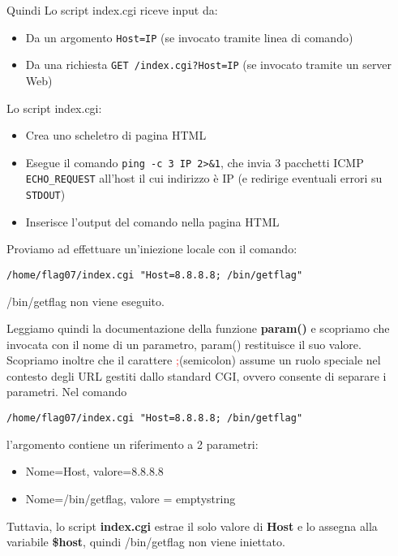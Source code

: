 Quindi Lo script index.cgi riceve input da:
\begin{itemize}
    \item Da un argomento \texttt{Host=IP} (se invocato tramite linea di comando)
    \item Da una richiesta \texttt{GET /index.cgi?Host=IP} (se invocato tramite un server Web)
\end{itemize}
Lo script index.cgi:
\begin{itemize}
    \item Crea uno scheletro di pagina HTML
    \item Esegue il comando \texttt{ping -c 3 IP 2>\&1}, che invia 3 pacchetti ICMP \texttt{ECHO\_REQUEST} all’host il cui indirizzo è IP (e redirige eventuali errori su \texttt{STDOUT})
    \item Inserisce l’output del comando nella pagina HTML
\end{itemize}
Proviamo ad effettuare un’iniezione locale con il comando:
\begin{lstlisting}[style=bashstyle]
    /home/flag07/index.cgi "Host=8.8.8.8; /bin/getflag"
\end{lstlisting}
/bin/getflag non viene eseguito.

Leggiamo quindi la documentazione della funzione \textbf{param()} e scopriamo che invocata con il nome di un parametro, param() restituisce il suo valore.
Scopriamo inoltre che il carattere \textcolor{red}{;}(semicolon) assume un ruolo speciale nel contesto degli URL gestiti dallo standard CGI, ovvero consente di separare i parametri.
Nel comando \begin{lstlisting}[style=bashstyle]
    /home/flag07/index.cgi "Host=8.8.8.8; /bin/getflag"
\end{lstlisting} l'argomento contiene un riferimento a 2 parametri:
\begin{itemize}
    \item Nome=Host, valore=8.8.8.8 
    \item Nome=/bin/getflag, valore = emptystring  
\end{itemize}
Tuttavia, lo script \textbf{index.cgi} estrae il solo valore di \textbf{Host} e lo assegna alla variabile \textbf{\$host}, quindi /bin/getflag non viene iniettato.

